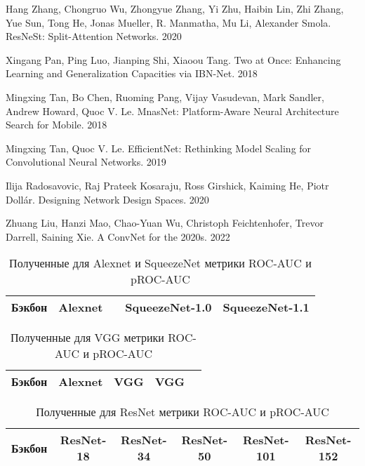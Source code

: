 \documentclass{article}
\begin{document}
\begin{large}
\begin{thebibliography}{3}
	Hang Zhang, Chongruo Wu, Zhongyue Zhang, Yi Zhu, Haibin Lin, Zhi Zhang, Yue Sun, Tong He, Jonas Mueller, R. Manmatha, Mu Li, Alexander Smola.
	ResNeSt: Split-Attention Networks. 2020
	
	Xingang Pan, Ping Luo, Jianping Shi, Xiaoou Tang.
	Two at Once: Enhancing Learning and Generalization Capacities via IBN-Net. 2018
	
	Mingxing Tan, Bo Chen, Ruoming Pang, Vijay Vasudevan, Mark Sandler, Andrew Howard, Quoc V. Le.
	MnasNet: Platform-Aware Neural Architecture Search for Mobile. 2018
	
	Mingxing Tan, Quoc V. Le.
	EfficientNet: Rethinking Model Scaling for Convolutional Neural Networks. 2019
	
	Ilija Radosavovic, Raj Prateek Kosaraju, Ross Girshick, Kaiming He, Piotr Dollár.
	Designing Network Design Spaces. 2020
	
	Zhuang Liu, Hanzi Mao, Chao-Yuan Wu, Christoph Feichtenhofer, Trevor Darrell, Saining Xie.
	A ConvNet for the 2020s. 2022
	
	
\end{thebibliography}

\newpage
\appendix

\begin{table}
	\caption{Полученные для Alexnet и SqueezeNet метрики ROC-AUC и pROC-AUC}\label{tab_alex}
	\centering
	\begin{tabular}{| p{2.5cm} | c | c | c | c | }
		\hline
		Бэкбон & Alexnet & & SqueezeNet-1.0 & SqueezeNet-1.1 \\ \hline
		
		\hline
	\end{tabular}
\end{table}

\begin{table}
	\caption{Полученные для VGG метрики ROC-AUC и pROC-AUC}\label{tab_vgg}
	\centering
	\begin{tabular}{| p{2.5cm} | c | c | c | c | }
		\hline
		Бэкбон & Alexnet & VGG & VGG \\ \hline
		
		\hline
	\end{tabular}
\end{table}

\begin{table}
	\caption{Полученные для ResNet метрики ROC-AUC и pROC-AUC}\label{tab_res}
	\centering
	\begin{tabular}{| p{2.5cm} | c | c | c | c | c | }
		\hline
		Бэкбон & ResNet-18 & ResNet-34 & ResNet-50 & ResNet-101 & ResNet-152 \\ \hline
		

\end{tabular}
\end{table}
\end{large}
\end{document}
